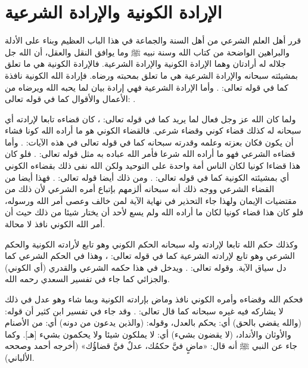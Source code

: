 \section{الإرادة الكونية والإرادة الشرعية}

قرر أهل العلم الشرعي من أهل السنة والجماعة في هذا الباب العظيم وبناء على الأدلة والبراهين الواضحة من كتاب الله وسنة نبيه ﷺ وما يوافق النقل والعقل، أن الله جل جلاله له أرادتان وهما الإرادة الكونية والإرادة الشرعية. فالإرادة الكونية هي ما تعلق بمشيئته سبحانه والإرادة الشرعية هي ما تعلق بمحبته ورضاه. فإرادة الله الكونية نافذة كما في قوله تعالى:
\quranayah*[36][82]{\footnotesize \surahname*[36]}. وأما الإرادة الشرعية فهي إرادة بيان لما يحبه الله ويرضاه من الأعمال والأقوال كما في قوله تعالى:
\quranayah*[4][26-28]{\footnotesize \surahname*[4]}.

ولما كان الله عز وجل فعال لما يريد كما في قوله تعالى:
\quranayah*[85][16]{\footnotesize \surahname*[16]}، كان قضاءه تابعا لإرادته أي سبحانه له كذلك قضاء كوني وقضاء شرعي. فالقضاء الكوني هو ما أراده الله كونا فشاء أن يكون فكان بعزته وعلمه وقدرته سبحانه كما في قوله تعالى في هذه الآيات:
\quranayah*[2][117]{\footnotesize \surahname*[2]}. %
وأما قضاءه الشرعي فهو ما أراده الله شرعا فأمر الله عباده به مثل قوله تعالى:
\quranayah*[17][23]{\footnotesize \surahname*[17]}. فلو كان هذا قضاءا كونيا لكان الناس أمة واحدة على التوحيد ولكن الله نفى ذلك بقضاءه الكوني أي بمشيئته الكونية كما في قوله تعالى: \quranayah*[16][93]{\footnotesize \surahname*[16]}.
ومن ذلك أيضا قوله تعالى:
\quranayah*[33][36]{\footnotesize \surahname*[33]}. فهذا أيضا من القضاء الشرعي ووجه ذلك أنه سبحانه ألزمهم بإتباع أمره الشرعي لأن ذلك من مقتضيات الإيمان ولهذا جاء التحذير في نهاية الآية لمن خالف وعصى أمر الله ورسوله، فلو كان هذا قضاء كونيا لكان ما أراده الله ولم يسع لأحد أن يختار شيئا من ذلك حيث أن أمر الله الكوني نافذ لا محالة.

وكذلك حكم الله تابعا لإرادته وله سبحانه الحكم الكوني وهو تابع لأرادته الكونية والحكم الشرعي وهو تابع لإرادته الشرعية كما في قوله تعالى:
\quranayah*[5][1]{\footnotesize \surahname*[5]}، وهذا في الحكم الشرعي كما دل سياق الآية. وقوله تعالى:
\quranayah*[13][41]{\footnotesize \surahname*[13]}. ويدخل في هذا حكمه الشرعي والقدري (أي الكوني) والجزائي كما جاء في تفسير السعدي رحمه الله.


فحكم الله وقضاءه وأمره الكوني نافذ وماض بإرادته الكونية وبما شاء وهو عدل في ذلك لا يشاركه فيه غيره سبحانه كما قال تعالى:
\quranayah*[40][20]{\footnotesize \surahname*[40]}. وقد جاء في تفسير ابن كثير أن قوله: (والله يقضي بالحق) أي: يحكم بالعدل، وقوله: (والذين يدعون من دونه) أي: من الأصنام والأوثان والأنداد، (لا يقضون بشيء) أي: لا يملكون شيئا ولا يحكمون بشيء [هـ]. وكما جاء عن النبي ﷺ أنه قال:
«ماضٍ فيَّ حكمُك، عدلٌ فيَّ قضاؤُك» {\footnotesize (أخرجه أحمد وصححه الألباني)}. 

